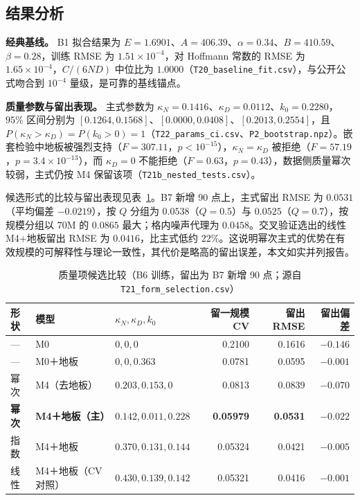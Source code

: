 \subsection{结果分析}
\label{sec:5.3.7}

\textbf{经典基线。} B1 拟合结果为 $E=1.6901$、$A=406.39$、$\alpha=0.34$、$B=410.59$、$\beta=0.28$，训练 RMSE 为 $1.51\times10^{-4}$，对 Hoffmann 常数的 RMSE 为 $1.65\times10^{-4}$，$C/(6ND)$ 中位比为 $1.0000$（\texttt{T20\_baseline\_fit.csv}），与公开公式吻合到 $10^{-4}$ 量级，是可靠的基线锚点。

\textbf{质量参数与留出表现。} 主式参数为 $\kappa_N=0.1416$、$\kappa_D=0.0112$、$k_0=0.2280$，$95\%$ 区间分别为 $[0.1264,0.1568]$、$[0.0000,0.0408]$、$[0.2013,0.2554]$，且 $P(\kappa_N>\kappa_D)=P(k_0>0)=1$（\texttt{T22\_params\_ci.csv}、\texttt{P2\_bootstrap.npz}）。嵌套检验中地板被强烈支持（$F=307.11$，$p<10^{-15}$），$\kappa_N=\kappa_D$ 被拒绝（$F=57.19$，$p=3.4\times10^{-13}$），而 $\kappa_D=0$ 不能拒绝（$F=0.63$，$p=0.43$），数据侧质量幂次较弱，主式仍按 M4 保留该项（\texttt{T21b\_nested\_tests.csv}）。

候选形式的比较与留出表现见表~\ref{tab:q2form}。B7 新增 90 点上，主式留出 RMSE 为 $0.0531$（平均偏差 $-0.0219$），按 $Q$ 分组为 $0.0538$（$Q=0.5$）与 $0.0525$（$Q=0.7$），按规模分组以 70M 的 $0.0865$ 最大；格内噪声代理为 $0.0458$。交叉验证选出的线性 M4+地板留出 RMSE 为 $0.0416$，比主式低约 $22\%$。这说明幂次主式的优势在有效规模的可解释性与理论一致性，其代价是略高的留出误差，本文如实并列报告。

\begin{table}[H]
\centering\small
\caption{质量项候选比较（B6 训练，留出为 B7 新增 90 点；源自 \texttt{T21\_form\_selection.csv}）}
\label{tab:q2form}
\begin{tabularx}{\textwidth}{@{}lllrrr@{}}
\toprule
形状 & 模型 & $\kappa_N,\kappa_D,k_0$ & 留一规模 CV & 留出 RMSE & 留出偏差 \\
\midrule
— & M0 & $0,0,0$ & 0.2100 & 0.1616 & $-0.146$ \\
— & M0＋地板 & $0,0,0.363$ & 0.0781 & 0.0595 & $-0.001$ \\
幂次 & M4（去地板） & $0.203,0.153,0$ & 0.0813 & 0.0839 & $-0.070$ \\
\textbf{幂次} & \textbf{M4＋地板（主）} & $\mathbf{0.142,0.011,0.228}$ & \textbf{0.05979} & \textbf{0.0531} & $\mathbf{-0.022}$ \\
指数 & M4＋地板 & $0.370,0.131,0.144$ & 0.05324 & 0.0421 & $-0.005$ \\
线性 & M4＋地板（CV 对照） & $0.430,0.139,0.142$ & 0.05321 & 0.0416 & $-0.001$ \\
\bottomrule
\end{tabularx}
\end{table}

